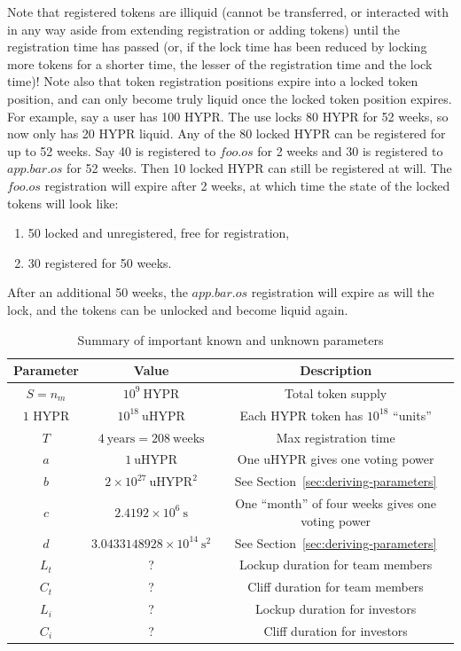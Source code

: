 \documentclass{article}
\begin{document}
Note that registered tokens are illiquid (cannot be transferred, or interacted with in any way aside from extending registration or adding tokens) until the registration time has passed (or, if the lock time has been reduced by locking more tokens for a shorter time, the lesser of the registration time and the lock time)!
Note also that token registration positions expire into a locked token position, and can only become truly liquid once the locked token position expires.
For example, say a user has 100 HYPR.
The use locks 80 HYPR for 52 weeks, so now only has 20 HYPR liquid.
Any of the 80 locked HYPR can be registered for up to 52 weeks.
Say 40 is registered to $foo.os$ for 2 weeks and 30 is registered to $app.bar.os$ for 52 weeks.
Then 10 locked HYPR can still be registered at will.
The $foo.os$ registration will expire after 2 weeks, at which time the state of the locked tokens will look like:
\begin{enumerate}
    \item 50 locked and unregistered, free for registration,
    \item 30 registered for 50 weeks.
\end{enumerate}
After an additional 50 weeks, the $app.bar.os$ registration will expire as will the lock, and the tokens can be unlocked and become liquid again.

\begin{table}[htbp]
    \centering
    \caption{Summary of important known and unknown parameters}
    \label{tab:student-performance}
    \begin{tabular}{|c|c|c|}
    \hline
    \textbf{Parameter} & \textbf{Value} & \textbf{Description} \\
    \hline
    $S = n_m$ & $10^9~\text{HYPR}$ & Total token supply \\
    $1$ HYPR & $10^{18}~\text{uHYPR}$ & Each HYPR token has $10^{18}$ ``units'' \\
    $T$ & $4~\text{years} = 208~\text{weeks}$ & Max registration time \\
    $a$ & $1~\text{uHYPR}$ & One uHYPR gives one voting power \\
    $b$ & $2 \times 10^{27}~\text{uHYPR}^2$ & See Section~\ref{sec:deriving-parameters} \\
    $c$ & $2.4192 \times 10^6~\text{s}$ & One ``month'' of four weeks gives one voting power \\
    $d$ & $3.0433148928 \times 10^{14}~\text{s}^2$ & See Section~\ref{sec:deriving-parameters} \\
    $L_t$ & ? & Lockup duration for team members \\
    $C_t$ & ? & Cliff duration for team members \\
    $L_i$ & ? & Lockup duration for investors \\
    $C_i$ & ? & Cliff duration for investors \\
    \hline
	\end{tabular}
\end{table}
\end{document}
